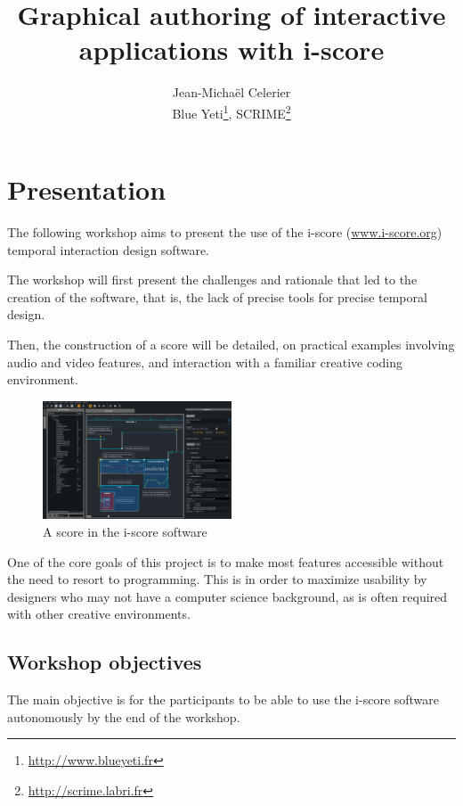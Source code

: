 \documentclass[11pt]{article}
\title{Graphical authoring of interactive applications with i-score}
\author{Jean-Michaël Celerier\\ \small Blue Yeti\thanks{\url{http://www.blueyeti.fr}}, SCRIME\thanks{\url{http://scrime.labri.fr}}}
\date{}
\begin{document}
\maketitle
\vspace{-3cm}
\section*{Presentation}
The following workshop aims to present the use of the i-score (\url{www.i-score.org}) temporal interaction design software.

The workshop will first present the challenges and rationale that led to the creation of the software, that is, the lack of precise tools for precise temporal design.

Then, the construction of a score will be detailed, on practical examples involving audio and video features, and interaction with a familiar creative coding environment.

\begin{figure}[h]
	\centering
	\includegraphics[width=0.5\textwidth]{images/iscore.png}
	\caption*{A score in the i-score software}
\end{figure}

One of the core goals of this project is to make most features accessible without the need to resort to programming. This is in order to maximize usability by designers who may not have a computer science background, as is often required with other creative environments.
\subsection*{Workshop objectives}
The main objective is for the participants to be able to use the i-score software autonomously by the end of the workshop.
\end{document}
